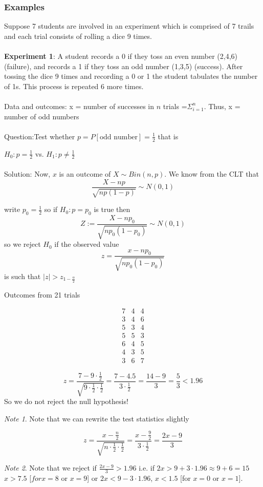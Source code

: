 \documentclass[12pt,a4paper]{article}
\theoremstyle{regla}
\theoremstyle{remark}
\newtheorem{notes}{Note}[section]
\theoremstyle{definition}
\theoremstyle{nonumberbreak}
\begin{document}
\subsubsection{Examples}
\begin{xmpl}
Suppose 7 students are involved in an experiment which is comprised of 7 trails and each trial consists of rolling a dice 9 times.\\
\\
\textbf{Experiment 1}: A student records a 0 if they toss an even number (2,4,6) (failure), and records a 1 if they toss an odd number (1,3,5) (success). After tossing the dice 9 times and recording a 0 or 1 the student tabulates the number of 1s. This process is repeated 6 more times. \\
\\
Data and outcomes: 
x = number of successes in $n$ trials =$\Sigma_{i=1}^n$.
Thus, x = number of odd numbers\\\\

Question:Test whether $p=P[\text{odd number}]=\frac{1}{2}$ that is 
		
$H_0: p=\frac{1}{2}$ vs. $H_1: p\neq \frac{1}{2}$
 \\\\
Solution:
Now, $x$ is an outcome of $X \sim Bin(n,p)$. We know from the CLT that
$$\frac{X-np}{\sqrt{np(1-p)}} \sim N(0,1)$$

write $p_0=\frac{1}{2}$ so if $H_0:p=p_0$ is true then
$$Z:=\frac{X-np_0}{\sqrt{np_0(1-p_0)}}\sim N(0,1)$$
so we reject $H_0$ if the observed value
$$z=\frac{x-np_0}{\sqrt{np_0(1-p_0)}}$$
is such that 
$\left | z\right | >z_{1-\frac{\alpha}{2}}$



Outcomes from 21 trials 


$$\begin{matrix}
7 & 4 & 4\\
3 & 4 & 6\\
5 & 3 & 4\\
5 & 5 & 3\\
6 & 4 & 5\\
4 & 3 & 5\\
3 & 6 & 7
\end{matrix}$$

$$z=\frac{7-9\cdot \frac{1}{2}}{\sqrt{9\cdot\frac{1}{2}\cdot \frac{1}{2}}}=\frac{7-4.5}{3\cdot\frac{1}{2}}=\frac{14-9}{3}=\frac{5}{3} < 1.96$$
So we do not reject the null hypothesis! 

\begin{notes}
Note that we can rewrite the test statistics slightly

$$z=\frac{x-\frac{n}{2}}{\sqrt{n\cdot\frac{1}{2}\cdot\frac{1}{2}}}=\frac{x-\frac{9}{2}}{3\cdot\frac{1}{2}}=\frac{2x-9}{3}$$
\end{notes}
\begin{notes}
Note that we reject if $\frac{2x-9}{3}>1.96$ i.e. if $2x>9+3\cdot1.96 \approx 9+6=15$\\

$x>7.5$ [$for x=8$ or $x=9$] or $2x<9-3 \cdot 1.96$, $x<1.5$ [for $x=0$ or $x=1$].
\end{notes}
\end {xmpl} 
\end{document}
